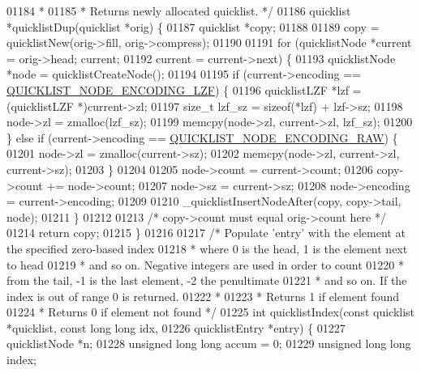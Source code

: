 \begin{DoxyCode}
{{{{{{{{01184 \textcolor{comment}{ *}
01185 \textcolor{comment}{ * Returns newly allocated quicklist. */}
01186 quicklist *quicklistDup(quicklist *orig) \{
01187     quicklist *copy;
01188 
01189     copy = quicklistNew(orig->fill, orig->compress);
01190 
01191     \textcolor{keywordflow}{for} (quicklistNode *current = orig->head; current;
01192          current = current->next) \{
01193         quicklistNode *node = quicklistCreateNode();
01194 
01195         \textcolor{keywordflow}{if} (current->encoding == \hyperlink{quicklist_8h_a6ce238912d4049e020b686def25c9566}{QUICKLIST\_NODE\_ENCODING\_LZF}) \{
01196             quicklistLZF *lzf = (quicklistLZF *)current->zl;
01197             size\_t lzf\_sz = \textcolor{keyword}{sizeof}(*lzf) + lzf->sz;
01198             node->zl = zmalloc(lzf\_sz);
01199             memcpy(node->zl, current->zl, lzf\_sz);
01200         \} \textcolor{keywordflow}{else} \textcolor{keywordflow}{if} (current->encoding == \hyperlink{quicklist_8h_a064c051a8fda9aa87dc3556b9cafc911}{QUICKLIST\_NODE\_ENCODING\_RAW}) \{
01201             node->zl = zmalloc(current->sz);
01202             memcpy(node->zl, current->zl, current->sz);
01203         \}
01204 
01205         node->count = current->count;
01206         copy->count += node->count;
01207         node->sz = current->sz;
01208         node->encoding = current->encoding;
01209 
01210         \_quicklistInsertNodeAfter(copy, copy->tail, node);
01211     \}
01212 
01213     \textcolor{comment}{/* copy->count must equal orig->count here */}
01214     \textcolor{keywordflow}{return} copy;
01215 \}
01216 
01217 \textcolor{comment}{/* Populate 'entry' with the element at the specified zero-based index}
01218 \textcolor{comment}{ * where 0 is the head, 1 is the element next to head}
01219 \textcolor{comment}{ * and so on. Negative integers are used in order to count}
01220 \textcolor{comment}{ * from the tail, -1 is the last element, -2 the penultimate}
01221 \textcolor{comment}{ * and so on. If the index is out of range 0 is returned.}
01222 \textcolor{comment}{ *}
01223 \textcolor{comment}{ * Returns 1 if element found}
01224 \textcolor{comment}{ * Returns 0 if element not found */}
01225 \textcolor{keywordtype}{int} quicklistIndex(\textcolor{keyword}{const} quicklist *quicklist, \textcolor{keyword}{const} \textcolor{keywordtype}{long} \textcolor{keywordtype}{long} idx,
01226                    quicklistEntry *entry) \{
01227     quicklistNode *n;
01228     \textcolor{keywordtype}{unsigned} \textcolor{keywordtype}{long} \textcolor{keywordtype}{long} accum = 0;
01229     \textcolor{keywordtype}{unsigned} \textcolor{keywordtype}{long} \textcolor{keywordtype}{long} index;
}}}}}}}}
\end{DoxyCode}
